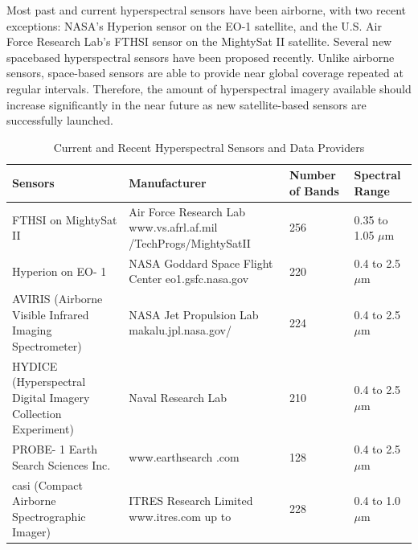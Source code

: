 \documentclass[document.tex]{subfiles}
\begin{document}
\noindent Most past and current hyperspectral sensors have been airborne, with two
recent exceptions: NASA’s Hyperion sensor on the EO-1 satellite, and the U.S. Air
Force Research Lab’s FTHSI sensor on the MightySat II satellite. Several new spacebased
hyperspectral sensors have been proposed recently. Unlike airborne
sensors, space-based sensors are able to provide near global coverage repeated at regular
intervals. Therefore, the amount of hyperspectral imagery available should increase
significantly in the near future as new satellite-based sensors are successfully launched.
\begin{table}[H]
	\caption{Current and Recent Hyperspectral Sensors and Data Providers}
	\begin{center}
		\begin{tabularx}{\columnwidth}{|X|X|X|X|}
			\hline
			Sensors & Manufacturer & Number of
			Bands &
			Spectral Range\\ \hline
			FTHSI on
			MightySat
			II &
			Air Force Research
			Lab www.vs.afrl.af.mil
			/TechProgs/MightySatII &
			256  & 0.35 to 1.05 $\mu$m \\ \hline
			Hyperion
			on EO- 1 &
			NASA Goddard
			Space Flight Center
			eo1.gsfc.nasa.gov &
			220 & 0.4 to 2.5 $\mu$m\\ \hline
			AVIRIS
			(Airborne
			Visible
			Infrared
			Imaging
			Spectrometer) &
			NASA Jet
			Propulsion Lab
			makalu.jpl.nasa.gov/ &
			224 & 0.4 to 2.5 $\mu$m\\ \hline
			HYDICE
			(Hyperspectral
			Digital
			Imagery
			Collection
			Experiment) &
			Naval Research Lab & 210 & 0.4 to 2.5 $\mu$m \\ \hline
			PROBE-
			1 Earth
			Search
			Sciences
			Inc. &
			www.earthsearch .com & 128 & 0.4 to 2.5 $\mu$m\\ \hline
			
			casi (Compact
			Airborne
			Spectrographic
			Imager) &
			ITRES Research Limited
			www.itres.com
			up to  & 228 & 0.4 to 1.0$\mu$m\\ \hline
		\end{tabularx}
	\end{center}
	\label{tab:Current and Recent Hyperspectral Sensors and Data Providers}
\end{table}
\clearpage
\end{document}
